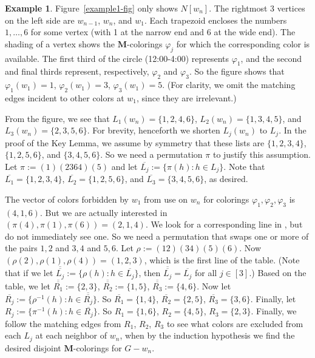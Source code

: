 \documentclass[11pt]{article}
\theoremstyle{definition}
\newtheorem{example}{Example}
\newcommand\vph{\varphi}
\newcommand\MM{\textbf{M}}
\begin{document}
\begin{example}
\label{example1}
Figure~\ref{example1-fig} only shows  $N[w_n]$.  The rightmost 3 vertices on the left side are 
$w_{n-1}$, $w_n$, and $w_1$.  Each trapezoid encloses the numbers $1,\ldots,6$ for some vertex (with
1 at the narrow end and 6 at the wide end).  The shading of a vertex shows the $\MM$-colorings $\vph_j$
for which the corresponding color is available.  The first third of the circle (12:00-4:00) represents
$\vph_1$, and the second and final thirds represent, respectively, $\vph_2$ and $\vph_3$.  
So the figure shows that $\vph_1(w_1)=1$, $\vph_2(w_1)=3$, $\vph_3(w_1)=5$.  (For clarity,
we omit the matching edges incident to other colors at $w_1$, since they are irrelevant.)

From the figure, we see that $L_1(w_n)=\{1,2,4,6\}$, $L_2(w_n)=\{1,3,4,5\}$, and $L_3(w_n)=\{2,3,5,6\}$.
For brevity, henceforth we shorten $L_j(w_n)$ to $L_j$.  In the proof of the Key Lemma, we assume by symmetry 
that these lists are $\{1,2,3,4\}$, $\{1,2,5,6\}$, and $\{3,4,5,6\}$.  So we need a permutation $\pi$ to 
justify this assumption.  Let $\pi:=(1)(2364)(5)$ and let $\overline{L_j}:=\{\pi(h):h\in L_j\}$.  Note that 
$\overline{L_1}=\{1,2,3,4\}$, $\overline{L_2}=\{1,2,5,6\}$, and $\overline{L_3}=\{3,4,5,6\}$, as desired. 

The vector of colors forbidden by $w_1$ from use on $w_n$ for colorings $\vph_1,\vph_2,\vph_3$ is $(4,1,6)$.
But we are actually interested in $(\pi(4),\pi(1),\pi(6))=(2,1,4)$.  We look for a corresponding line in
, but do not immediately see one.  So we need a permutation that swaps one or more of the pairs
$1,2$ and $3,4$ and $5,6$.  Let $\rho:=(12)(34)(5)(6)$.  Now $(\rho(2),\rho(1),\rho(4))=(1,2,3)$, which is
the first line of the table.  (Note that if we let $\overline{\overline{L_j}}:=\{\rho(h):h\in \overline{L_j}\}$,
then $\overline{\overline{L_j}}=\overline{L_j}$ for all $j\in [3]$.) Based on the table, we let 
$\overline{\overline{R_1}} :=\{2,3\}$, $\overline{\overline{R_2}}:=\{1,5\}$, 
$\overline{\overline{R_3}}:=\{4,6\}$.  Now let $\overline{R_j}:=\{\rho^{-1}(h):h\in 
\overline{\overline{R_j}}\}$.  So $\overline{R_1}=\{1,4\}$, $\overline{R_2}=\{2,5\}$, 
$\overline{R_3}=\{3,6\}$.  Finally, let $R_j:=\{\pi^{-1}(h):h\in\overline{R_j}\}$.  
So $R_1=\{1,6\}$, $R_2=\{4,5\}$, $R_3=\{2,3\}$.  Finally, we follow the matching edges from $R_1$, $R_2$, 
$R_3$ to see what colors are excluded from each $L_j$ at each neighbor of $w_n$, when by the induction 
hypothesis we find the desired disjoint $\MM$-colorings for $G-w_n$.
\end{example}
\end{document}

